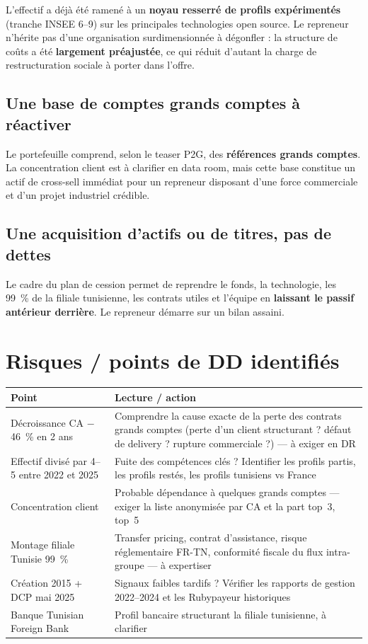 \documentclass[11pt,a4paper]{article}
\begin{document}
L'effectif a déjà été ramené à un \textbf{noyau resserré de profils expérimentés} (tranche INSEE 6--9) sur les principales technologies open source. Le repreneur n'hérite pas d'une organisation surdimensionnée à dégonfler : la structure de coûts a été \textbf{largement préajustée}, ce qui réduit d'autant la charge de restructuration sociale à porter dans l'offre.

\subsection{Une base de comptes grands comptes à réactiver}

Le portefeuille comprend, selon le teaser P2G, des \textbf{références grands comptes}. La concentration client est à clarifier en data room, mais cette base constitue un actif de cross-sell immédiat pour un repreneur disposant d'une force commerciale et d'un projet industriel crédible.

\subsection{Une acquisition d'actifs ou de titres, pas de dettes}

Le cadre du plan de cession permet de reprendre le fonds, la technologie, les 99~\% de la filiale tunisienne, les contrats utiles et l'équipe en \textbf{laissant le passif antérieur derrière}. Le repreneur démarre sur un bilan assaini.

\section{Risques / points de DD identifiés}

\begin{longtable}{L{5cm}L{10cm}}
\toprule
\textbf{Point} & \textbf{Lecture / action} \\
\midrule
\endhead
Décroissance CA $-$46~\% en 2 ans & Comprendre la cause exacte de la perte des contrats grands comptes (perte d'un client structurant ? défaut de delivery ? rupture commerciale ?) --- à exiger en DR \\
Effectif divisé par 4--5 entre 2022 et 2025 & Fuite des compétences clés ? Identifier les profils partis, les profils restés, les profils tunisiens vs France \\
Concentration client & Probable dépendance à quelques grands comptes --- exiger la liste anonymisée par CA et la part top~3, top~5 \\
Montage filiale Tunisie 99~\% & Transfer pricing, contrat d'assistance, risque réglementaire FR-TN, conformité fiscale du flux intra-groupe --- à expertiser \\
Création 2015 + DCP mai 2025 & Signaux faibles tardifs ? Vérifier les rapports de gestion 2022--2024 et les Rubypayeur historiques \\
Banque Tunisian Foreign Bank & Profil bancaire structurant la filiale tunisienne, à clarifier \\
\bottomrule
\end{longtable}
\end{document}
